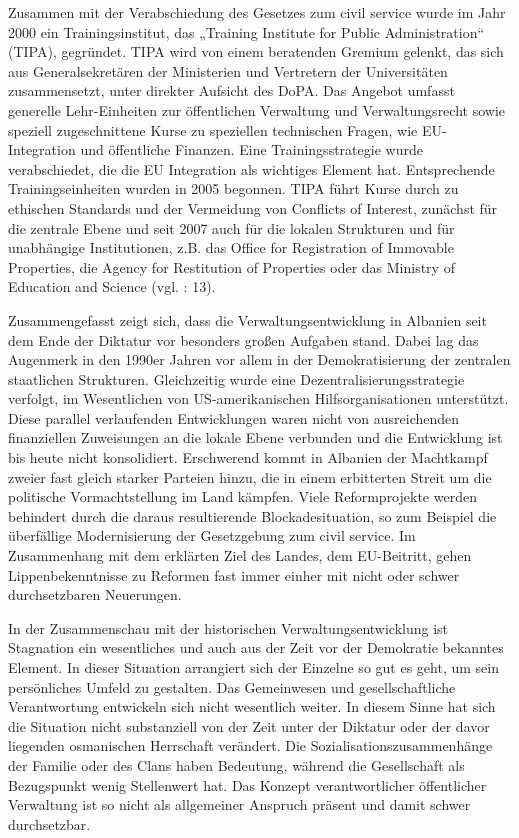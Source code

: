 Zusammen mit der Verabschiedung des Gesetzes zum civil service wurde im Jahr 2000 ein Trainingsinstitut, das „Training Institute for Public Administration“ (TIPA), gegründet. TIPA wird von einem beratenden Gremium gelenkt, das sich aus Generalsekretären der Ministerien und Vertretern der Universitäten zusammensetzt, unter direkter Aufsicht des DoPA. Das Angebot umfasst generelle Lehr-Einheiten zur öffentlichen Verwaltung und Verwaltungsrecht sowie speziell zugeschnittene Kurse zu speziellen technischen Fragen, wie EU-Integration und öffentliche Finanzen. Eine Trainingsstrategie wurde verabschiedet, die die EU Integration als wichtiges Element hat. Entsprechende Trainingseinheiten wurden in 2005 begonnen. TIPA führt Kurse durch zu ethischen Standards und der Vermeidung von Conflicts of Interest, zunächst für die zentrale Ebene und seit 2007 auch für die lokalen Strukturen und für unabhängige Institutionen, z.B. das Office for Registration of Immovable Properties, die Agency for Restitution of Properties oder das Ministry of Education and Science (vgl.  \cite{oecd09} : 13).\par
Zusammengefasst zeigt sich, dass die Verwaltungsentwicklung in Albanien seit dem Ende der Diktatur vor besonders großen Aufgaben stand. Dabei lag das Augenmerk in den 1990er Jahren vor allem in der Demokratisierung der zentralen staatlichen Strukturen. Gleichzeitig wurde eine Dezentralisierungsstrategie verfolgt, im Wesentlichen von US-amerikanischen Hilfsorganisationen unterstützt. Diese parallel verlaufenden Entwicklungen waren nicht von ausreichenden finanziellen Zuweisungen an die lokale Ebene verbunden und die Entwicklung ist bis heute nicht konsolidiert. Erschwerend kommt in Albanien der Machtkampf zweier fast gleich starker Parteien hinzu, die in einem erbitterten Streit um die politische Vormachtstellung im Land kämpfen. Viele Reformprojekte werden behindert durch die daraus resultierende Blockadesituation, so zum Beispiel die überfällige Modernisierung der Gesetzgebung zum civil service. Im Zusammenhang mit dem erklärten Ziel des Landes, dem EU-Beitritt, gehen Lippenbekenntnisse zu Reformen fast immer einher mit nicht oder schwer durchsetzbaren Neuerungen.\par
In der Zusammenschau mit der historischen Verwaltungsentwicklung ist Stagnation ein wesentliches und auch aus der Zeit vor der Demokratie bekanntes Element. In dieser Situation arrangiert sich der Einzelne so gut es geht, um sein persönliches Umfeld zu gestalten. Das Gemeinwesen und gesellschaftliche Verantwortung entwickeln sich nicht wesentlich weiter. In diesem Sinne hat sich die Situation nicht substanziell von der Zeit unter der Diktatur oder der davor liegenden osmanischen Herrschaft verändert. Die Sozialisationszusammenhänge der Familie oder des Clans haben Bedeutung, während die Gesellschaft als Bezugspunkt wenig Stellenwert hat. Das Konzept verantwortlicher öffentlicher Verwaltung ist so nicht als allgemeiner Anspruch präsent und damit schwer durchsetzbar.
